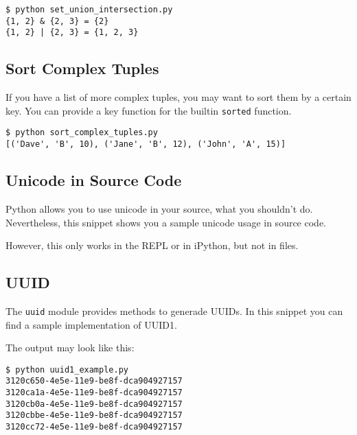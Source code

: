 

\begin{lstlisting}[caption=set\_union\_intersection.py]
$ python set_union_intersection.py
{1, 2} & {2, 3} = {2}
{1, 2} | {2, 3} = {1, 2, 3}
\end{lstlisting}


\subsection{Sort Complex Tuples}

If you have a list of more complex tuples, you may want to sort them by a certain key.
You can provide a key function for the builtin \lstinline{sorted} function.



\begin{lstlisting}[caption=Output of sort\_complex\_tuples.py]
$ python sort_complex_tuples.py
[('Dave', 'B', 10), ('Jane', 'B', 12), ('John', 'A', 15)]
\end{lstlisting}


\subsection{Unicode in Source Code}

Python allows you to use unicode in your source, what you shouldn't do.
Nevertheless, this snippet shows you a sample unicode usage in source code.



However, this only works in the REPL or in iPython, but not in files.


\subsection{UUID}

The \lstinline{uuid} module provides methods to generade UUIDs.
In this snippet you can find a sample implementation of UUID1.



The output may look like this:

\begin{lstlisting}[caption=Output of uuid1\_example.py]
$ python uuid1_example.py
3120c650-4e5e-11e9-be8f-dca904927157
3120ca1a-4e5e-11e9-be8f-dca904927157
3120cb0a-4e5e-11e9-be8f-dca904927157
3120cbbe-4e5e-11e9-be8f-dca904927157
3120cc72-4e5e-11e9-be8f-dca904927157
\end{lstlisting}


